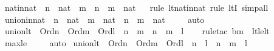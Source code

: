 \begin{isabellebody}
%
\endisadelimproof
\isanewline
{}\isamarkupfalse%
\ nat{\isacharunderscore}{\kern0pt}in{\isacharunderscore}{\kern0pt}nat\ {\isacharcolon}{\kern0pt}\ {\isachardoublequoteopen}n\ {\isasymin}\ nat\ {\isasymLongrightarrow}\ m\ {\isasymin}\ n\ {\isasymLongrightarrow}\ m\ {\isasymin}\ nat{\isachardoublequoteclose}\isanewline
%
\isadelimproof
\ \ %
\endisadelimproof
%
\isatagproof
{}\isamarkupfalse%
{\isacharparenleft}{\kern0pt}rule\ lt{\isacharunderscore}{\kern0pt}nat{\isacharunderscore}{\kern0pt}in{\isacharunderscore}{\kern0pt}nat{\isacharcomma}{\kern0pt}\ rule\ ltI{\isacharcomma}{\kern0pt}\ simp{\isacharunderscore}{\kern0pt}all{\isacharparenright}{\kern0pt}%
\endisatagproof
{\isafoldproof}%
%
\isadelimproof
\isanewline
%
\endisadelimproof
\isanewline
{}\isamarkupfalse%
\ union{\isacharunderscore}{\kern0pt}in{\isacharunderscore}{\kern0pt}nat\ {\isacharcolon}{\kern0pt}\ {\isachardoublequoteopen}n\ {\isasymin}\ nat\ {\isasymLongrightarrow}\ m\ {\isasymin}\ nat\ {\isasymLongrightarrow}\ n\ {\isasymunion}\ m\ {\isasymin}\ nat{\isachardoublequoteclose}\ \isanewline
%
\isadelimproof
\ \ %
\endisadelimproof
%
\isatagproof
{}\isamarkupfalse%
\ auto%
\endisatagproof
{\isafoldproof}%
%
\isadelimproof
\isanewline
%
\endisadelimproof
\isanewline
{}\isamarkupfalse%
\ union{\isacharunderscore}{\kern0pt}lt{}\ {\isacharcolon}{\kern0pt}\ {\isachardoublequoteopen}Ord{\isacharparenleft}{\kern0pt}n{\isacharparenright}{\kern0pt}\ {\isasymLongrightarrow}\ Ord{\isacharparenleft}{\kern0pt}m{\isacharparenright}{\kern0pt}\ {\isasymLongrightarrow}\ Ord{\isacharparenleft}{\kern0pt}l{\isacharparenright}{\kern0pt}\ {\isasymLongrightarrow}\ n\ {\isacharless}{\kern0pt}\ m\ {\isasymLongrightarrow}\ n\ {\isacharless}{\kern0pt}\ m\ {\isasymunion}\ l{\isachardoublequoteclose}\ \isanewline
%
\isadelimproof
\ \ %
\endisadelimproof
%
\isatagproof
{}\isamarkupfalse%
{\isacharparenleft}{\kern0pt}rule{\isacharunderscore}{\kern0pt}tac\ b{\isacharequal}{\kern0pt}m\ \ lt{\isacharunderscore}{\kern0pt}le{\isacharunderscore}{\kern0pt}lt{\isacharparenright}{\kern0pt}\isanewline
\ \ \isamarkupfalse%
\ max{\isacharunderscore}{\kern0pt}le{}\ \isanewline
\ \ \isamarkupfalse%
\ auto%
\endisatagproof
{\isafoldproof}%
%
\isadelimproof
\isanewline
%
\endisadelimproof
{}\isamarkupfalse%
\ union{\isacharunderscore}{\kern0pt}lt{}\ {\isacharcolon}{\kern0pt}\ {\isachardoublequoteopen}Ord{\isacharparenleft}{\kern0pt}n{\isacharparenright}{\kern0pt}\ {\isasymLongrightarrow}\ Ord{\isacharparenleft}{\kern0pt}m{\isacharparenright}{\kern0pt}\ {\isasymLongrightarrow}\ Ord{\isacharparenleft}{\kern0pt}l{\isacharparenright}{\kern0pt}\ {\isasymLongrightarrow}\ n\ {\isacharless}{\kern0pt}\ l\ {\isasymLongrightarrow}\ n\ {\isacharless}{\kern0pt}\ m\ {\isasymunion}\ l{\isachardoublequoteclose}\ \isanewline

\end{isabellebody}
